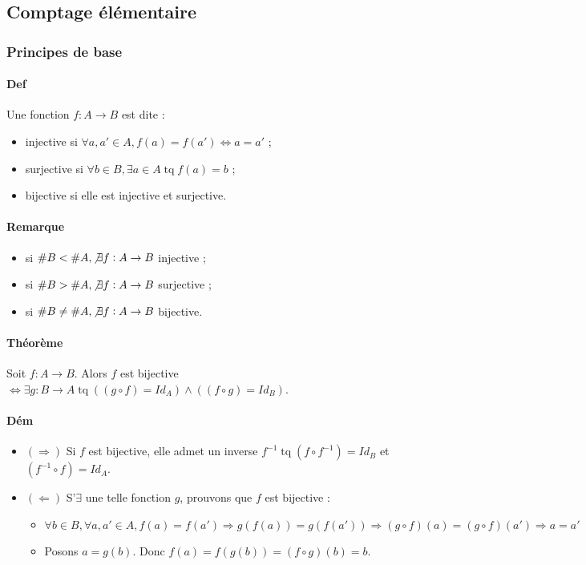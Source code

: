 \documentclass{article}
\newenvironment{lst}
	{\begin{minipage}[t]{.9\linewidth}\begin{itemize}}
	{\end{itemize}\end{minipage}}
\DeclareMathOperator{\tq}{\text{ tq }}
\begin{document}
		\subsection{Comptage élémentaire}
		
			\subsubsection{Principes de base}
			
			\paragraph{Def} Une fonction $f : A \to B$ est dite :
			\begin{itemize}
				\item injective si $\forall a, a' \in A, f(a) = f(a') \iff a = a'$ ;
				\item surjective si $\forall b \in B, \exists a \in A \tq f(a) = b$ ;
				\item bijective si elle est injective et surjective.
			\end{itemize}
			
			\paragraph{Remarque}
			\begin{lst}
				\item si $\#B < \#A, \not \exists f : A \to B$ injective ;
				\item si $\#B > \#A, \not \exists f : A \to B$ surjective ;
				\item si $\#B \neq \#A, \not \exists f : A \to B$ bijective.
			\end{lst}
			
			\paragraph{Théorème} Soit $f : A \to B$. Alors $f$ est bijective $\iff \exists g : B \to A \tq ((g \circ f) = Id_A) \land ((f \circ g) = Id_B)$.
			
			\paragraph{Dém}
			\begin{lst}

				\item $(\Rightarrow)$ Si $f$ est bijective, elle admet un inverse $f^{-1} \tq (f \circ f^{-1}) = Id_B$ et $(f^{-1} \circ f) = Id_A$.
			
				\item $(\Leftarrow)$ S'$\exists $ une telle fonction $g$, prouvons que $f$ est bijective :
				
				\begin{itemize}
					\item $\forall b \in B, \forall a, a' \in A, f(a) = f(a') \Rightarrow g(f(a)) = g(f(a')) \Rightarrow (g \circ f)(a) = (g \circ f)(a') \Rightarrow a = a'$
					\item Posons $a = g(b)$. Donc $f(a) = f(g(b)) = (f \circ g)(b) = b$. 
				\end{itemize}
			\end{lst}
			
\end{document}
